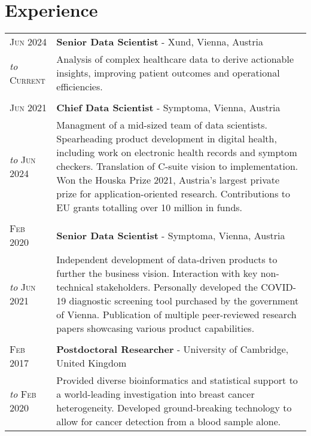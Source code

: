 \section{Experience}
\begin{tabular}{>{\raggedleft}p{2.15cm}|p{12cm}}

	\textsc{Jun 2024} &  \textbf{Senior Data Scientist} - Xund, Vienna, Austria \\
	\emph{to} \textsc{Current} & Analysis of complex healthcare data to derive actionable insights, improving patient outcomes and operational efficiencies. \\
	\multicolumn{2}{c}{}\\
	
	\textsc{Jun 2021} &  \textbf{Chief Data Scientist} - Symptoma, Vienna, Austria \\
	\emph{to} \textsc{Jun 2024} & Managment of a mid-sized team of data scientists. Spearheading product development in digital health, including work on electronic health records and symptom checkers. Translation of C-suite vision to implementation. Won the Houska Prize 2021, Austria's largest private prize for application-oriented research. Contributions to EU grants totalling over 10 million in funds. \\
	
	\multicolumn{2}{c}{}\\

    \textsc{Feb 2020} & \textbf{Senior Data Scientist} - Symptoma, Vienna, Austria \\
	\emph{to} \textsc{Jun 2021} & Independent development of data-driven products to further the business vision. Interaction with key non-technical stakeholders. Personally developed the COVID-19 diagnostic screening tool purchased by the government of Vienna. Publication of multiple peer-reviewed research papers showcasing various product capabilities. \\
	\multicolumn{2}{c}{}\\
	
	
    \textsc{Feb 2017} &  \textbf{Postdoctoral Researcher} - University of Cambridge, United Kingdom\\
	\emph{to} \textsc{Feb 2020} & Provided diverse bioinformatics and statistical support to a world-leading investigation into breast cancer heterogeneity. Developed ground-breaking technology to allow for cancer detection from a blood sample alone. \\
	
	

\end{tabular}
